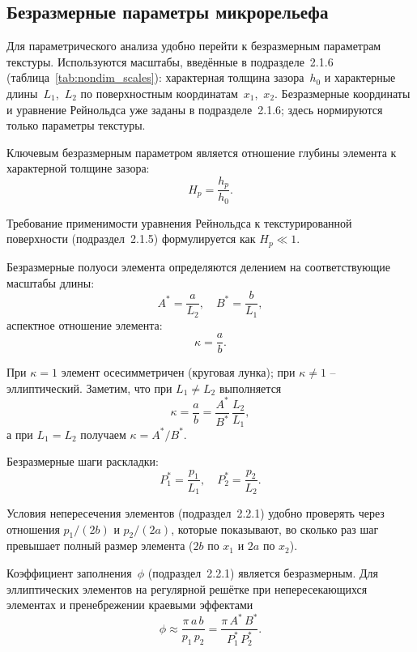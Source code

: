 \subsection{Безразмерные параметры микрорельефа}

Для параметрического анализа удобно перейти к безразмерным параметрам текстуры.
Используются масштабы, введённые в подразделе~2.1.6
(таблица~\ref{tab:nondim_scales}): характерная толщина зазора~$h_0$
и характерные длины~$L_1$,~$L_2$ по поверхностным координатам~$x_1$,~$x_2$.
Безразмерные координаты и уравнение Рейнольдса уже заданы
в подразделе~2.1.6; здесь нормируются только параметры текстуры.

Ключевым безразмерным параметром является отношение глубины элемента
к характерной толщине зазора:
\begin{equation}\label{eq:Hp_nondim}
  H_p = \frac{h_p}{h_0}.
\end{equation}

Требование применимости уравнения Рейнольдса к текстурированной
поверхности (подраздел~2.1.5) формулируется как $H_p \ll 1$.

Безразмерные полуоси элемента определяются делением на соответствующие
масштабы длины:
\begin{equation}\label{eq:AB_nondim}
  A^{*} = \frac{a}{L_2}, \quad B^{*} = \frac{b}{L_1},
\end{equation}
аспектное отношение элемента:
\begin{equation}\label{eq:kappa}
  \kappa = \frac{a}{b}.
\end{equation}

При $\kappa = 1$ элемент осесимметричен (круговая лунка);
при $\kappa \neq 1$ -- эллиптический.
Заметим, что при $L_1 \neq L_2$ выполняется
\[
  \kappa = \frac{a}{b}
         = \frac{A^{*}}{B^{*}}\,\frac{L_2}{L_1},
\]
а при $L_1 = L_2$ получаем $\kappa = A^{*}/B^{*}$.

Безразмерные шаги раскладки:
\begin{equation}\label{eq:P_nondim}
  P_1^{*} = \frac{p_1}{L_1}, \quad P_2^{*} = \frac{p_2}{L_2}.
\end{equation}

Условия непересечения элементов (подраздел~2.2.1) удобно проверять
через отношения $p_1/(2b)$ и $p_2/(2a)$, которые показывают,
во сколько раз шаг превышает полный размер элемента
($2b$ по $x_1$ и $2a$ по $x_2$).

Коэффициент заполнения~$\phi$ (подраздел~2.2.1) является безразмерным.
Для эллиптических элементов на регулярной решётке при непересекающихся
элементах и пренебрежении краевыми эффектами
\begin{equation}\label{eq:phi_nondim}
  \phi \approx \frac{\pi\, a\, b}{p_1\, p_2}
       = \frac{\pi\, A^{*}\, B^{*}}{P_1^{*}\, P_2^{*}}.
\end{equation}

